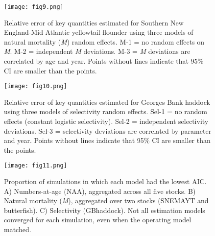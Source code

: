 \documentclass[]{article}
\begin{document}
\pagebreak

\begin{figure}

{\centering \texttt{[image: fig9.png]} 

}

\caption{Relative error of key quantities estimated for Southern New England-Mid Atlantic yellowtail flounder using three models of natural mortality (\textit{M}) random effects. M-1 = no random effects on \textit{M}. M-2 = independent \textit{M} deviations. M-3 = \textit{M} deviations are correlated by age and year. Points without lines indicate that 95\% CI are smaller than the points.}\label{fig:rel-error-snemayt-m}
\end{figure}

\pagebreak

\begin{figure}

{\centering \texttt{[image: fig10.png]} 

}

\caption{Relative error of key quantities estimated for Georges Bank haddock using three models of selectivity random effects. Sel-1 = no random effects (constant logistic selectivity). Sel-2 = independent selectivity deviations. Sel-3 = selectivity deviations are correlated by parameter and year. Points without lines indicate that 95\% CI are smaller than the points.}\label{fig:rel-error-GBhaddock-sel}
\end{figure}

\pagebreak

\begin{figure}

{\centering \texttt{[image: fig11.png]} 

}

\caption{Proportion of simulations in which each model had the lowest AIC. A) Numbers-at-age (NAA), aggregated across all five stocks. B) Natural mortality (\textit{M}), aggregated over two stocks (SNEMAYT and butterfish). C) Selectivity (GBhaddock). Not all estimation models converged for each simulation, even when the operating model matched.}\label{fig:aic-cross}
\end{figure}
\end{document}
